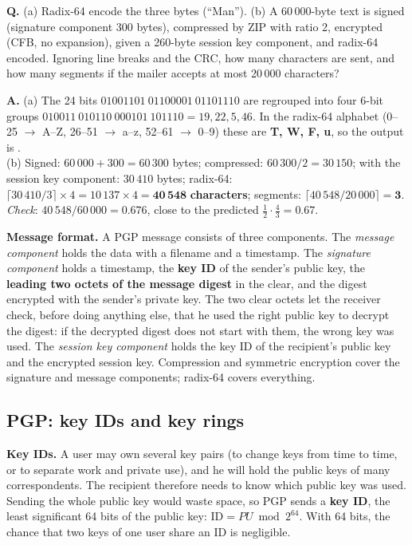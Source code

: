\begin{worked}
\textbf{Q.} (a) Radix-64 encode the three bytes  (``Man''). (b) A 60\,000-byte text is signed (signature component 300 bytes), compressed by ZIP with ratio 2, encrypted (CFB, no expansion), given a 260-byte session key component, and radix-64 encoded. Ignoring line breaks and the CRC, how many characters are sent, and how many segments if the mailer accepts at most 20\,000 characters?

\textbf{A.} (a) The 24 bits $01001101\ 01100001\ 01101110$ are regrouped into four 6-bit groups $010011\ 010110\ 000101\ 101110 = 19, 22, 5, 46$. In the radix-64 alphabet (0--25 $\to$ A--Z, 26--51 $\to$ a--z, 52--61 $\to$ 0--9) these are \textbf{T, W, F, u}, so the output is .\\
(b) Signed: $60\,000 + 300 = 60\,300$ bytes; compressed: $60\,300 / 2 = 30\,150$; with the session key component: $30\,410$ bytes; radix-64: $\lceil 30\,410 / 3 \rceil \times 4 = 10\,137 \times 4 = \mathbf{40\,548}$ \textbf{characters}; segments: $\lceil 40\,548 / 20\,000 \rceil = \mathbf{3}$.\\
\emph{Check}: $40\,548 / 60\,000 = 0.676$, close to the predicted $\frac12 \cdot \frac43 = 0.67$.
\end{worked}

\textbf{Message format.} A PGP message consists of three components. The \emph{message component} holds the data with a filename and a timestamp. The \emph{signature component} holds a timestamp, the \textbf{key ID} of the sender's public key, the \textbf{leading two octets of the message digest} in the clear, and the digest encrypted with the sender's private key. The two clear octets let the receiver check, before doing anything else, that he used the right public key to decrypt the digest: if the decrypted digest does not start with them, the wrong key was used. The \emph{session key component} holds the key ID of the recipient's public key and the encrypted session key. Compression and symmetric encryption cover the signature and message components; radix-64 covers everything.

\subsection{PGP: key IDs and key rings \new}

\textbf{Key IDs.} A user may own several key pairs (to change keys from time to time, or to separate work and private use), and he will hold the public keys of many correspondents. The recipient therefore needs to know which public key was used. Sending the whole public key would waste space, so PGP sends a \textbf{key ID}, the least significant 64 bits of the public key: $\text{ID} = PU \bmod 2^{64}$. With 64 bits, the chance that two keys of one user share an ID is negligible.

